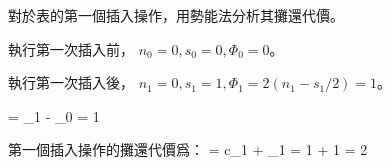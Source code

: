 \startEXERCISE
對於表的第一個插入操作，用勢能法分析其攤還代價。
\stopEXERCISE

\startANSWER
執行第一次插入前， $n_0 = 0, s_0 = 0, \Phi_0 = 0$。

執行第一次插入後， $n_1 = 0, s_1 = 1, \Phi_1 = 2(n_1 - s_1 / 2) = 1$。

\startformula
\Delta\Phi = \Phi_1 - \Phi_0 = 1
\stopformula

第一個插入操作的攤還代價爲：
\startsplitformula\startmathalignment
\NC {} \NC = c_1 + \Delta\Phi_1 \NR
\NC \NC = 1 + 1 \NR
\NC \NC = 2 \NR
\stopmathalignment\stopsplitformula
\stopANSWER
